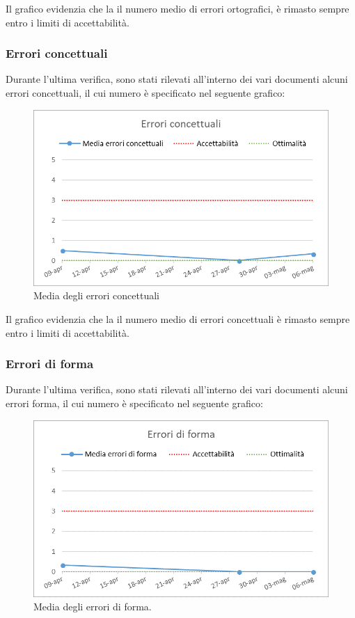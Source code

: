 Il grafico evidenzia che la il numero medio di errori ortografici, è rimasto sempre entro i limiti di accettabilità.

\clearpage

\subsubsection{Errori concettuali}

Durante l'ultima verifica, sono stati rilevati all'interno dei vari documenti alcuni errori concettuali, il cui numero è specificato nel seguente grafico:

\begin{figure}[h!]
	\centering
	\includegraphics[scale=0.6]{img/Grafici/Errori_conce.png}
	\caption{Media degli errori concettuali}
	\label{fig:Errori_conce}
\end{figure}

Il grafico evidenzia che la il numero medio di errori concettuali è rimasto sempre entro i limiti di accettabilità.

\subsubsection{Errori di forma}

Durante l'ultima verifica, sono stati rilevati all'interno dei vari documenti alcuni errori forma, il cui numero è specificato nel seguente grafico:

\begin{figure}[h!]
	\centering
	\includegraphics[scale=0.6]{img/Grafici/Errori_forma.png}
	\caption{Media degli errori di forma.}
	\label{fig:Errori_forma}
\end{figure}

